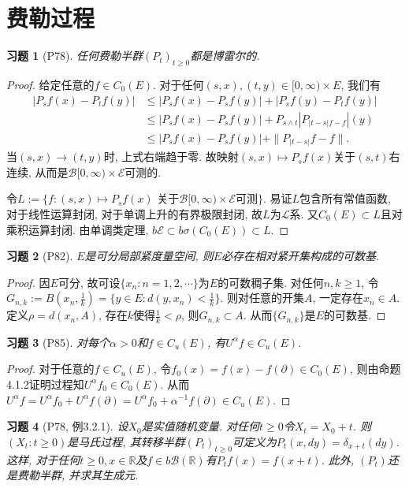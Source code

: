 \documentclass[UTF8,ondside]{ctexart}
\newtheorem{exercise}{习题}[section]
\newcommand{\h}{\mathscr}
\newcommand{\kx}{\mathbb}
\numberwithin{equation}{section}
\begin{document}
	\section{费勒过程}
	\begin{exercise}[P78]
		任何费勒半群$(P_t)_{t\geq 0}$都是博雷尔的.
	\end{exercise}
	\begin{proof}
		给定任意的$f\in C_0(E)$. 对于任何$(s,x),(t,y)\in [0,\infty)\times E$, 我们有
		\[
			\begin{aligned}
				|P_s f(x)-P_t f(y)|&\leq |P_s f(x)-P_s f(y)|+|P_s f(y)-P_t f(y)|\\
				&\leq |P_s f(x)-P_s f(y)| + P_{s\land t}|P_{|t-s|f-f}|(y)\\
				&\leq |P_s f(x)-P_s f(y)| + \|P_{|t-s|}f-f\|.
			\end{aligned}
		\]
		当$(s,x)\rightarrow (t,y)$时, 上式右端趋于零. 故映射$(s,x)\mapsto P_s f(x)$关于$(s,t)$右连续, 从而是$\h B[0,\infty)\times\h E$可测的.

		令$L:=\{f: (s,x)\mapsto P_s f(x) \text{ 关于$\h B[0,\infty)\times\h E$可测}\}$. 易证$L$包含所有常值函数, 对于线性运算封闭, 对于单调上升的有界极限封闭, 故$L$为$\h L$系. 又$C_0(E)\subset L$且对乘积运算封闭. 由单调类定理, $b\h E\subset b\sigma(C_0(E))\subset L$. 
	\end{proof}
	\begin{exercise}[P82]
		$E$是可分局部紧度量空间, 则$E$必存在相对紧开集构成的可数基. 
	\end{exercise}
	\begin{proof}
		因$E$可分, 故可设$\{x_n:n=1,2,\cdots\}$为$E$的可数稠子集. 对任何$n,k\geq 1$, 令$G_{n,k}:=B(x_n,\frac{1}{k})=\{y\in E:d(y,x_n)<\frac{1}{k}\}$. 则对任意的开集$A$, 一定存在$x_n\in A$. 定义$\rho = d(x_n,A)$, 存在$k$使得$\frac{1}{k}<\rho$, 则$G_{n,k}\subset A$. 从而$\{G_{n,k}\}$是$E$的可数基.
	\end{proof}
	\begin{exercise}[P85]
		对每个$\alpha>0$和$f\in C_u(E)$, 有$U^\alpha f\in C_u(E)$.
	\end{exercise}
	\begin{proof}
		对于任意的$f\in C_u(E)$, 令$f_0(x)=f(x)-f(\partial)\in C_0(E)$, 则由命题4.1.2证明过程知$U^\alpha f_0\in C_0(E)$. 从而$U^\alpha f=U^\alpha f_0+ U^\alpha f(\partial)=U^\alpha f_0+\alpha^{-1}f(\partial)\in C_u(E)$.
	\end{proof}
	\begin{exercise}[P78, 例3.2.1]
		设$X_0$是实值随机变量. 对任何$t\geq 0$令$X_t=X_0+t$. 则$(X_t:t\geq 0)$是马氏过程, 其转移半群$(P_t)_{t\geq 0}$可定义为$P_t(x,dy)=\delta_{x+t}(dy)$. 这样, 对于任何$t\geq 0,x\in\kx R$及$f\in b\h B(\kx R)$有$P_tf(x)=f(x+t)$. 此外, $(P_t)$还是费勒半群, 并求其生成元.
	\end{exercise}
\end{document}
